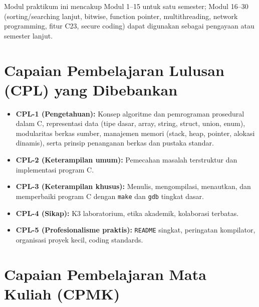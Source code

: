 \documentclass[../main.tex]{subfiles}
\begin{document}
Modul praktikum ini mencakup Modul 1--15 untuk satu semester; Modul 16--30 (sorting/searching lanjut, bitwise, function pointer, multithreading, network programming, fitur C23, secure coding) dapat digunakan sebagai pengayaan atau semester lanjut.

\section{Capaian Pembelajaran Lulusan (CPL) yang Dibebankan}

\begin{itemize}[leftmargin=*]
  \item \textbf{CPL-1 (Pengetahuan):} Konsep algoritme dan pemrograman prosedural dalam C, representasi data (tipe dasar, array, string, struct, union, enum), modularitas berkas sumber, manajemen memori (stack, heap, pointer, alokasi dinamis), serta prinsip penanganan berkas dan pustaka standar.
  \item \textbf{CPL-2 (Keterampilan umum):} Pemecahan masalah terstruktur dan implementasi program C.
  \item \textbf{CPL-3 (Keterampilan khusus):} Menulis, mengompilasi, menautkan, dan memperbaiki program C dengan \texttt{make} dan \texttt{gdb} tingkat dasar.
  \item \textbf{CPL-4 (Sikap):} K3 laboratorium, etika akademik, kolaborasi terbatas.
  \item \textbf{CPL-5 (Profesionalisme praktis):} \texttt{README} singkat, peringatan kompilator, organisasi proyek kecil, coding standards.
\end{itemize}

\section{Capaian Pembelajaran Mata Kuliah (CPMK)}
\end{document}
